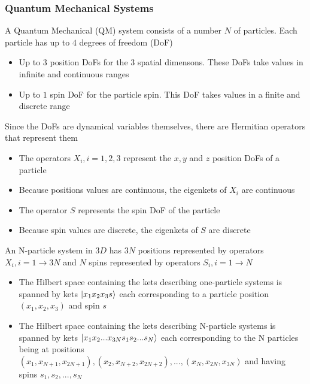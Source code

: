 \documentclass[8pt,t,mathserif,aspectratio=169]{beamer}
\begin{document}
\begin{frame}
  \frametitle{Quantum Mechanical Systems}
  \vspace{1mm}
  A Quantum Mechanical (QM) system consists of a number $N$ of particles. Each particle has up to $4$ degrees of freedom (DoF)
  \begin{itemize}
    \item Up to $3$ position DoFs for the $3$ spatial dimensons. These DoFs take values in infinite and continuous ranges
    \item Up to $1$ spin DoF for the particle spin. This DoF takes values in a finite and discrete range 
  \end{itemize}
  Since the DoFs are dynamical variables themselves, there are Hermitian operators that represent them
  \begin{itemize}
    \item The operators $X_i, i = 1,2,3$ represent the $x,y$ and $z$ position DoFs of a particle
    \item Because positions values are continuous, the eigenkets of $X_i$ are continuous
    \item The operator $S$ represents the spin DoF of the particle
    \item Because spin values are discrete, the eigenkets of $S$ are discrete
    \end{itemize}
  An N-particle system in $3D$ has $3N$ positions represented by operators $X_i, i = 1 \to 3N$ and $N$ spins represented by operators $S_i, i = 1 \to N$
  \begin{itemize}
    \item The Hilbert space containing the kets describing one-particle systems is spanned by kets $\ket{x_1 x_2 x_3 s}$ each corresponding to a particle position $(x_1,x_2,x_3)$ and spin $s$
    \item The Hilbert space containing the kets describing N-particle systems is spanned by kets $\ket{x_1 x_2 ... x_{3N} s_1 s_2 ... s_N}$ each corresponding to the N particles being at positions $(x_1,x_{N+1},x_{2N+1}), (x_2,x_{N+2},x_{2N+2}), ..., (x_N,x_{2N},x_{3N})$ and having spins $s_1,s_2,...,s_N$
  \end{itemize}
\end{frame}
\end{document}
